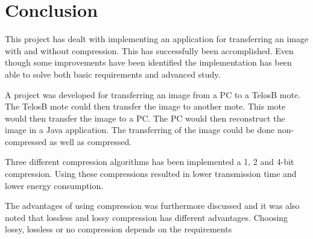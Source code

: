\chapter{Conclusion}
\label{chp:conc}

This project has dealt with implementing an application for transferring an image with and without compression. This has successfully been accomplished. Even though some improvements have been identified the implementation has been able to solve both basic requirements and advanced study.

A project was developed for transferring an image from a PC to a TelosB mote. The TelosB mote could then transfer the image to another mote. This mote would then transfer the image to a PC. The PC would then reconstruct the image in a Java application. The transferring of the image could be done non-compressed as well as compressed. 

Three different compression algorithms has been implemented a 1, 2 and 4-bit compression. Using these compressions resulted in lower transmission time and lower energy consumption.  

The advantages of using compression was furthermore discussed and it was also noted that lossless and lossy compression has different advantages. Choosing lossy, lossless or no compression depends on the requirements